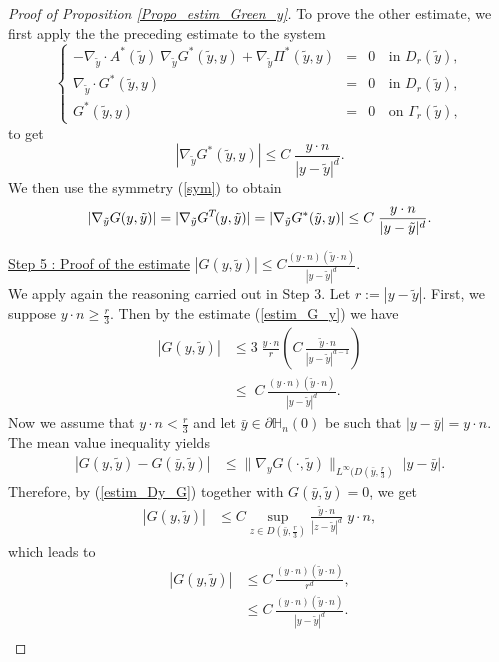 \documentclass[11pt, reqno]{amsart}
\theoremstyle{definition}
\theoremstyle{remark}
\numberwithin{equation}{section}
\begin{document}
\begin{appendices}
\begin{proof}[Proof of \textup{Proposition \ref{Propo_estim_Green_y}}]
		\noindent To prove  the other estimate, we first apply the the preceding estimate to the system 
		\begin{equation}
			\left\{
			\begin{array}{rcll}
				-\nabla_{\tilde{y}}\cdot A^* (\tilde{y}) \: \nabla_{\tilde{y}} G^*(\tilde{y},y) +  \nabla_{\tilde{y}} \Pi^*(\tilde{y},y)&=& 0   &\mbox{in }  D_r( \tilde{y} ) ,\\
				\nabla_{\tilde{y}} \cdot G^*(\tilde{y},y)&=& 0  & \mbox{in }  D_r( \tilde{y} ) ,\\
				G^*(\tilde{y},y) &=& 0 \,   &\mbox{on } \Gamma_r( \tilde{y}),
			\end{array}
			\right.  
		\end{equation}	
		to get
		\begin{equation*}
			| \nabla_{\tilde{y}} G^*(\tilde{y},y)| \leq C \; \frac{y\cdot n}{|y-\tilde{y}|^d} .
		\end{equation*}
		We then use the symmetry (\ref{sym}) to obtain
		\begin{equation*}
			| \nabla_{\tilde{y}} G(y,\tilde{y})| =  | \nabla_{\tilde{y}} G^T\!(y,\tilde{y})| = | \nabla_{\tilde{y}} G^*(\tilde{y},y)|   \leq C \; \frac{y\cdot n}{|y-\tilde{y}|^d} .\\
		\end{equation*}
		
		\noindent \underline{Step 5 : Proof of the estimate}  $| G(y,\tilde{y})| \leq C  \frac{(y\cdot n)(\tilde{y}\cdot n) }{|y-\tilde{y}|^d} .$\\
		We apply again the reasoning carried out in Step  3. 
		Let $r:=|y-\tilde{y}|.$ 
		First, we suppose $y\cdot n \geq \frac{r}{3}$.  Then by the estimate (\ref{estim_G_y})  we have 
		\begin{align*}
			| G(y,\tilde{y})| &\leq 3\;  \frac{y\cdot n}{r}\left( C\, \frac{ \tilde{y}\cdot n}{|y-\tilde{y}|^{d-1}} \right)\\
			&\leq \;C\,\frac{  (y\cdot n)  (\tilde{y}\cdot n)  }{|y-\tilde{y}|^{d}} .
		\end{align*}
		Now we assume that $y\cdot n< \frac{r}{3}$  and let  $\bar{y}\in\partial\mathbb{H}_n(0)$ be such that $|y-\bar{y}|=y\cdot n$. 
		The mean value inequality yields 
		\begin{align*}
			| G(y,\tilde{y})- G(\bar{y},\tilde{y})| &\leq \|\nabla_y G(\cdot ,\tilde{y})\|_{L^{\infty}(D(\bar{y}, \frac{r}{3})} \; |y-\bar{y}| .
		\end{align*}
		Therefore, by  (\ref{estim_Dy_G}) together with $G(\bar{y},\tilde{y})=0$,    we get 
		\begin{align*}
			| G(y,\tilde{y})  | &\leq  C \sup_{z\in D(\bar{y}, \frac{r}{3})} \frac{ \tilde{y}\cdot n}{|z-\tilde{y}|^{d}}  \; y\cdot n ,
		\end{align*}
		which leads to
		\begin{align*}
			| G(y,\tilde{y})  | &\leq  C\, \frac{(y\cdot n) (\tilde{y}\cdot n) }{r^{d}},\\       
			&\leq  C\, \frac{ (y\cdot n) (\tilde{y}\cdot n)   }{ |y-\tilde{y}| ^{d}}.\\
		\end{align*}	
		

\end{proof}
\end{appendices}
\end{document}
